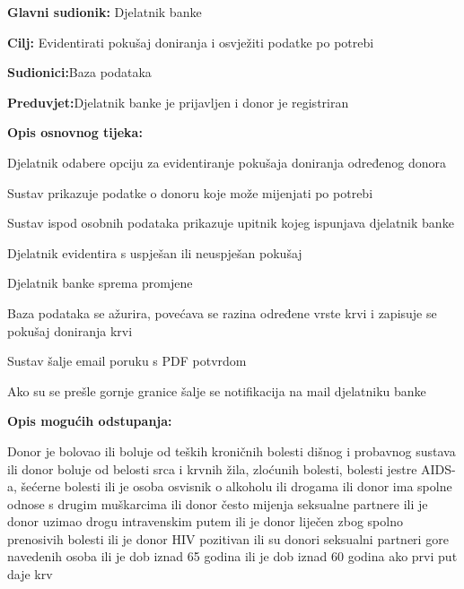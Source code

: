 \noindent {}

\begin{packed_item}
	
	\item \textbf{Glavni sudionik: }{Djelatnik banke}
	\item  \textbf{Cilj:} {Evidentirati pokušaj doniranja i osvježiti podatke po potrebi}
	\item  \textbf{Sudionici:}{Baza podataka} 
	\item  \textbf{Preduvjet:}{Djelatnik banke je prijavljen i donor je registriran}
	\item  \textbf{Opis osnovnog tijeka:}
	
	\item[] \begin{packed_enum}
		
		\item {Djelatnik odabere opciju za evidentiranje pokušaja doniranja određenog donora}
		\item {Sustav prikazuje podatke o donoru koje može mijenjati po potrebi}
		\item {Sustav ispod osobnih podataka prikazuje upitnik kojeg ispunjava djelatnik banke}
		\item {Djelatnik evidentira s uspješan ili neuspješan pokušaj}
		\item {Djelatnik banke sprema promjene}
		\item {Baza podataka se ažurira, povećava se razina određene vrste krvi i zapisuje se pokušaj doniranja krvi}
		\item {Sustav šalje email poruku s PDF potvrdom}
		\item {Ako su se prešle gornje granice šalje se notifikacija na mail djelatniku banke}
	\end{packed_enum}
	\item  \textbf{Opis mogućih odstupanja:}
	
	\item[] \begin{packed_item}
		\item[4.a] {Donor je bolovao ili boluje od teških kroničnih bolesti dišnog i probavnog sustava ili donor boluje od belosti srca i krvnih žila, zloćunih bolesti, bolesti jestre AIDS-a, šećerne bolesti ili je osoba osvisnik o alkoholu ili drogama ili donor ima spolne odnose s drugim muškarcima ili donor često mijenja seksualne partnere ili je donor uzimao drogu intravenskim putem ili je donor liječen zbog spolno prenosivih bolesti ili je donor HIV pozitivan ili su donori seksualni partneri gore navedenih osoba ili je dob iznad 65 godina ili je dob iznad 60 godina ako prvi put daje krv}
		\item[] \begin{packed_enum}
			

\end{packed_enum}
\end{packed_item}
\end{packed_item}

